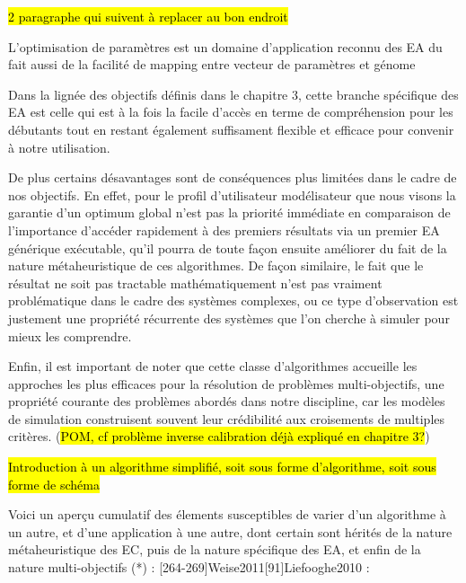 \hl{2 paragraphe qui suivent à replacer au bon endroit}

L'optimisation de paramètres est un domaine d'application reconnu des EA du fait aussi de la facilité de mapping entre vecteur de paramètres et génome \autocite[83]{DeJong2006a}

Dans la lignée des objectifs définis dans le chapitre 3, cette branche spécifique des EA est celle qui est à la fois la facile d'accès en terme de compréhension pour les débutants tout en restant également suffisament flexible et efficace pour convenir à notre utilisation. 

De plus certains désavantages sont de conséquences plus limitées dans le cadre de nos objectifs. En effet, pour le profil d'utilisateur modélisateur que nous visons la garantie d'un optimum global n'est pas la priorité immédiate en comparaison de l'importance d'accéder rapidement à des premiers résultats via un premier EA générique exécutable, qu'il pourra de toute façon ensuite améliorer du fait de la nature métaheuristique de ces algorithmes. De façon similaire, le fait que le résultat ne soit pas tractable mathématiquement n'est pas vraiment problématique dans le cadre des systèmes complexes, ou ce type d'observation est justement une propriété récurrente des systèmes que l'on cherche à simuler pour mieux les comprendre. 

Enfin, il est important de noter que cette classe d'algorithmes accueille les approches les plus efficaces pour la résolution de problèmes multi-objectifs, une propriété courante des problèmes abordés dans notre discipline, car les modèles de simulation construisent souvent leur crédibilité aux croisements de multiples critères. (\hl{POM, cf problème inverse calibration déjà expliqué en chapitre 3?})

\hl{Introduction à un algorithme simplifié, soit sous forme d'algorithme, soit sous forme de schéma}


Voici un aperçu cumulatif des élements susceptibles de varier d'un algorithme à un autre, et d'une application à une autre, dont certain sont hérités de la nature métaheuristique des EC, puis de la nature spécifique des EA, et enfin de la nature multi-objectifs (*) : \autocite[69,72,115]{DeJong2006a}[264-269]{Weise2011}[91]{Liefooghe2010} : 

